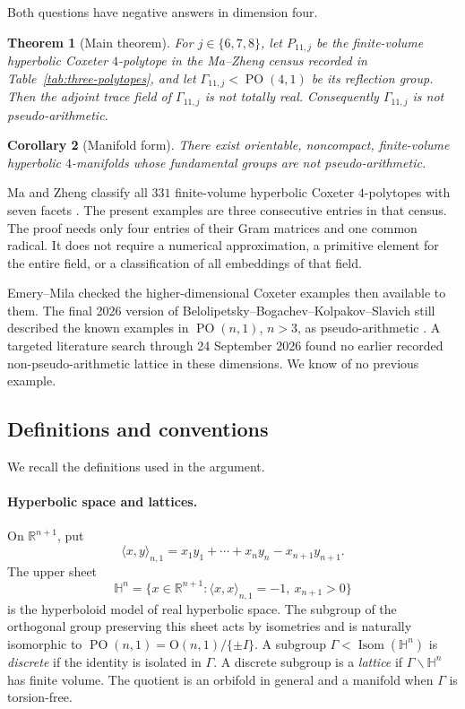 \documentclass[11pt]{article}
\numberwithin{equation}{section}
\newtheorem{theorem}{Theorem}[section]
\newtheorem{corollary}[theorem]{Corollary}
\theoremstyle{definition}
\theoremstyle{remark}
\newcommand{\R}{\mathbb{R}}
\newcommand{\HH}{\mathbb{H}}
\newcommand{\Isom}{\operatorname{Isom}}
\newcommand{\PO}{\operatorname{PO}}
\begin{document}
Both questions have negative answers in dimension four.

\begin{theorem}[Main theorem]
\label{thm:main}
For \(j\in\{6,7,8\}\), let \(P_{11,j}\) be the finite-volume hyperbolic
Coxeter \(4\)-polytope in the Ma--Zheng census recorded in
Table~\ref{tab:three-polytopes}, and let
\(\Gamma_{11,j}<\PO(4,1)\) be its reflection group.  Then the adjoint trace
field of \(\Gamma_{11,j}\) is not totally real.  Consequently
\(\Gamma_{11,j}\) is not pseudo-arithmetic.
\end{theorem}

\begin{corollary}[Manifold form]
\label{cor:manifolds}
There exist orientable, noncompact, finite-volume hyperbolic
\(4\)-manifolds whose fundamental groups are not pseudo-arithmetic.
\end{corollary}

Ma and Zheng classify all \(331\) finite-volume hyperbolic Coxeter
\(4\)-polytopes with seven facets \cite{MaZheng}.  The present examples are
three consecutive entries in that census.  The proof needs only four entries
of their Gram matrices and one common radical.  It does not require a
numerical approximation, a primitive element for the entire field, or a
classification of all embeddings of that field.

Emery--Mila checked the higher-dimensional Coxeter examples then available
to them.  The final 2026 version of
Belolipetsky--Bogachev--Kolpakov--Slavich still described the known examples
in \(\PO(n,1)\), \(n>3\), as pseudo-arithmetic \cite{BBKS}.  A targeted
literature search through 24 September 2026 found no earlier recorded
non-pseudo-arithmetic lattice in these dimensions.  We know of no previous
example.

\subsection{Definitions and conventions}
\label{subsec:primer}

We recall the definitions used in the argument.

\paragraph{Hyperbolic space and lattices.}
On \(\R^{n+1}\), put
\[
 \langle x,y\rangle_{n,1}
   =x_1y_1+\cdots+x_ny_n-x_{n+1}y_{n+1}.
\]
The upper sheet
\[
 \HH^n=\{x\in\R^{n+1}:\langle x,x\rangle_{n,1}=-1,
                       \ x_{n+1}>0\}
\]
is the hyperboloid model of real hyperbolic space.  The subgroup of the
orthogonal group preserving this sheet acts by isometries and is naturally
isomorphic to \(\PO(n,1)=\mathrm O(n,1)/\{\pm I\}\).  A subgroup
\(\Gamma<\Isom(\HH^n)\) is \emph{discrete} if the identity is isolated in
\(\Gamma\).  A discrete subgroup is a \emph{lattice} if
\(\Gamma\backslash\HH^n\) has finite volume.  The quotient is an orbifold in
general and a manifold when \(\Gamma\) is torsion-free.
\end{document}

